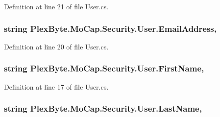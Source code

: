 Definition at line 21 of file User.\+cs.

\subsubsection[{\texorpdfstring{Email\+Address}{EmailAddress}}]{\setlength{\rightskip}{0pt plus 5cm}string Plex\+Byte.\+Mo\+Cap.\+Security.\+User.\+Email\+Address\hspace{0.3cm}{\ttfamily [get]}, {\ttfamily [set]}}\hypertarget{class_plex_byte_1_1_mo_cap_1_1_security_1_1_user_a0d766fcc163f7db495d4ef261a6ef02b}{}\label{class_plex_byte_1_1_mo_cap_1_1_security_1_1_user_a0d766fcc163f7db495d4ef261a6ef02b}


Definition at line 20 of file User.\+cs.

\subsubsection[{\texorpdfstring{First\+Name}{FirstName}}]{\setlength{\rightskip}{0pt plus 5cm}string Plex\+Byte.\+Mo\+Cap.\+Security.\+User.\+First\+Name\hspace{0.3cm}{\ttfamily [get]}, {\ttfamily [set]}}\hypertarget{class_plex_byte_1_1_mo_cap_1_1_security_1_1_user_a96c459a22a26f039f17e2e84f486db36}{}\label{class_plex_byte_1_1_mo_cap_1_1_security_1_1_user_a96c459a22a26f039f17e2e84f486db36}


Definition at line 17 of file User.\+cs.

\subsubsection[{\texorpdfstring{Last\+Name}{LastName}}]{\setlength{\rightskip}{0pt plus 5cm}string Plex\+Byte.\+Mo\+Cap.\+Security.\+User.\+Last\+Name\hspace{0.3cm}{\ttfamily [get]}, {\ttfamily [set]}}\hypertarget{class_plex_byte_1_1_mo_cap_1_1_security_1_1_user_a9313e5d0899cddf88e7171da9fbb9e31}{}\label{class_plex_byte_1_1_mo_cap_1_1_security_1_1_user_a9313e5d0899cddf88e7171da9fbb9e31}


